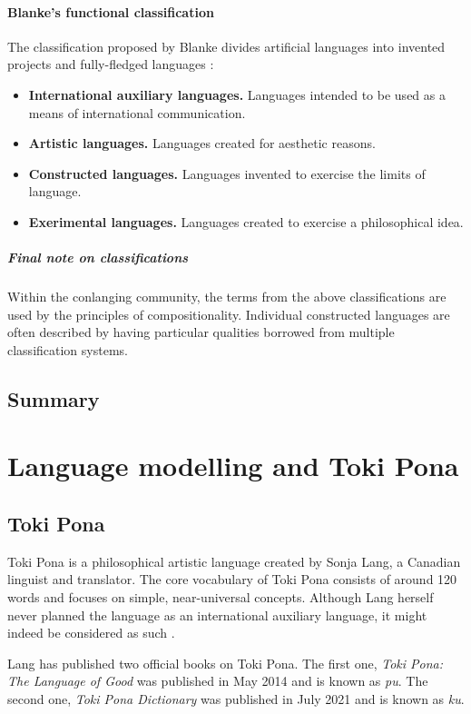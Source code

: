\documentclass[14pt, a4paper]{extreport}
\begin{document}
      \subsubsection{Blanke's functional classification}
The classification proposed by Blanke divides artificial languages into invented projects and fully-fledged languages \parencite{stria}:

\begin{itemize}
  \item \textbf{International auxiliary languages.} Languages intended to be used as a means of international communication.
  \item \textbf{Artistic languages.} Languages created for aesthetic reasons.
  \item \textbf{Constructed languages.} Languages invented to exercise the limits of language.
  \item \textbf{Exerimental languages.} Languages created to exercise a philosophical idea.
\end{itemize}
        \bigskip
        \paragraph{Final note on classifications}
Within the conlanging community, the terms from the above classifications are used by the principles of compositionality. Individual constructed languages are often described by having particular qualities borrowed from multiple classification systems.
    \section{Summary}


\chapter{Language modelling and Toki Pona}
  \section{Toki Pona}
Toki Pona is a philosophical artistic language created by Sonja Lang, a Canadian linguist and translator. The core vocabulary of Toki Pona consists of around 120 words and focuses on simple, near-universal concepts. Although Lang herself never planned the language as an international auxiliary language, it might indeed be considered as such \parencite[100]{stria}.

Lang has published two official books on Toki Pona. The first one, \textit{Toki Pona: The Language of Good} was published in May 2014 and is known as \textit{pu}. The second one, \textit{Toki Pona Dictionary} was published in July 2021 and is known as \textit{ku}.
\end{document}

